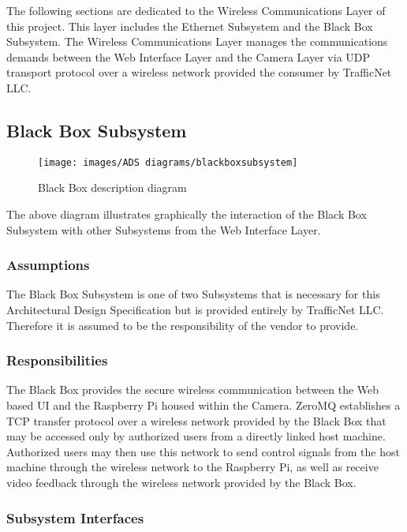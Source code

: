 The following sections are dedicated to the Wireless Communications Layer of this project. This layer includes the Ethernet Subsystem and the Black Box Subsystem. The Wireless Communications Layer manages the communications demands between the Web Interface Layer and the Camera Layer via UDP transport protocol over a wireless network provided the consumer by TrafficNet LLC.

\subsection{Black Box Subsystem}

\begin{figure}[h!]
	\centering
 	\texttt{[image: images/ADS diagrams/blackboxsubsystem]}
 \caption{Black Box description diagram}
\end{figure}

The above diagram illustrates graphically the interaction of the Black Box Subsystem with other Subsystems from the Web Interface Layer. 

\subsubsection{Assumptions}
The Black Box Subsystem is one of two Subsystems that is necessary for this Architectural Design Specification but is provided entirely by TrafficNet LLC. Therefore it is assumed to be the responsibility of the vendor to provide.

\subsubsection{Responsibilities}
The Black Box provides the secure wireless communication between the Web based UI and the Raspberry Pi housed within the Camera. ZeroMQ establishes a TCP transfer protocol over a wireless network provided by the Black Box that may be accessed only by authorized users from a directly linked host machine. Authorized users may then use this network to send control signals from the host machine through the wireless network to the Raspberry Pi, as well as receive video feedback through the wireless network provided by the Black Box.

\subsubsection{Subsystem Interfaces}

